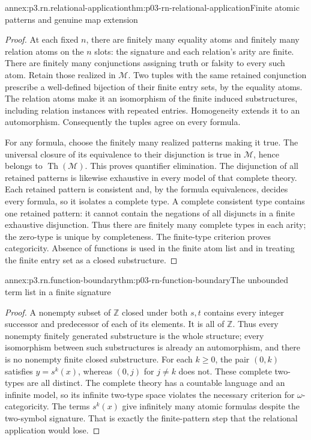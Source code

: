 \begin{annexitem}{annex:p3.rn.relational-application}{thm:p03-rn-relational-application}{Finite atomic patterns and genuine map extension}
\begin{proof}
At each fixed \(n\), there are finitely many equality
atoms and finitely many relation atoms on the \(n\)
slots: the signature and each relation's arity
are finite. There are finitely many conjunctions
assigning truth or falsity to every such atom.
Retain those realized in \(\mathcal M\).
Two tuples with the same retained conjunction prescribe
a well-defined bijection of their finite entry sets,
by the equality atoms.
The relation atoms make it an isomorphism of the
finite induced substructures, including relation
instances with repeated entries.
Homogeneity extends it to an automorphism.
Consequently the tuples agree on every formula.

For any formula, choose the finitely many realized
patterns making it true.
The universal closure of its equivalence to their
disjunction is true in \(\mathcal M\), hence belongs
to \(\operatorname{Th}(\mathcal M)\).
This proves quantifier elimination.
The disjunction of all retained patterns is likewise
exhaustive in every model of that complete theory.
Each retained pattern is consistent and, by the
formula equivalences, decides every formula, so
it isolates a complete type.
A complete consistent type contains one retained
pattern: it cannot contain the negations of all
disjuncts in a finite exhaustive disjunction.
Thus there are finitely many complete types in
each arity; the zero-type is unique by completeness.
The finite-type criterion proves categoricity.
Absence of functions is used in the finite atom
list and in treating the finite entry set as
a closed substructure.
\end{proof}
\end{annexitem}

\begin{annexitem}{annex:p3.rn.function-boundary}{thm:p03-rn-function-boundary}{The unbounded term list in a finite signature}
\begin{proof}
A nonempty subset of \(\mathbb Z\) closed under
both \(s,t\) contains every integer successor
and predecessor of each of its elements.
It is all of \(\mathbb Z\).
Thus every nonempty finitely generated substructure
is the whole structure; every isomorphism between
such substructures is already an automorphism,
and there is no nonempty finite closed substructure.
For each \(k\geq0\), the pair \((0,k)\) satisfies
\(y=s^k(x)\), whereas \((0,j)\) for \(j\ne k\)
does not. These complete two-types are all distinct.
The complete theory has a countable language and
an infinite model, so its infinite two-type space
violates the necessary criterion for
\(\omega\)-categoricity.
The terms \(s^k(x)\) give infinitely many atomic
formulas despite the two-symbol signature.
That is exactly the finite-pattern step that
the relational application would lose.
\end{proof}
\end{annexitem}

